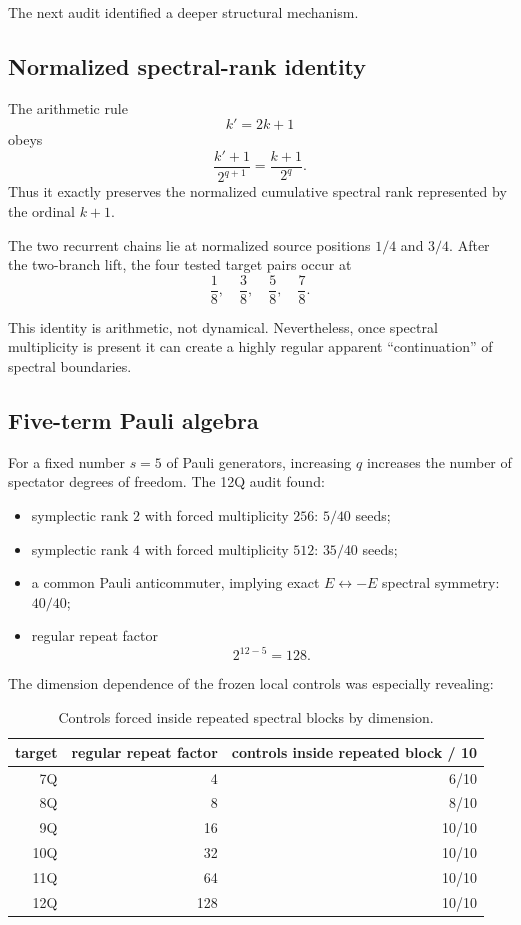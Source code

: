 \documentclass[11pt,a4paper]{article}
\begin{document}
The next audit identified a deeper structural mechanism.

\subsection{Normalized spectral-rank identity}

The arithmetic rule
\[
k' = 2k+1
\]
obeys
\[
\boxed{
\frac{k'+1}{2^{q+1}}
=
\frac{k+1}{2^q}.
}
\]
Thus it exactly preserves the normalized cumulative spectral rank represented
by the ordinal \(k+1\).

The two recurrent chains lie at normalized source positions \(1/4\) and
\(3/4\).  After the two-branch lift, the four tested target pairs occur at
\[
\frac18,\quad\frac38,\quad\frac58,\quad\frac78.
\]

This identity is arithmetic, not dynamical.  Nevertheless, once spectral
multiplicity is present it can create a highly regular apparent
``continuation'' of spectral boundaries.

\subsection{Five-term Pauli algebra}

For a fixed number \(s=5\) of Pauli generators, increasing \(q\) increases the
number of spectator degrees of freedom.  The 12Q audit found:

\begin{itemize}
\item symplectic rank \(2\) with forced multiplicity \(256\): \(5/40\) seeds;
\item symplectic rank \(4\) with forced multiplicity \(512\): \(35/40\) seeds;
\item a common Pauli anticommuter, implying exact \(E\leftrightarrow -E\)
      spectral symmetry: \(40/40\);
\item regular repeat factor
      \[
      2^{12-5}=128.
      \]
\end{itemize}

The dimension dependence of the frozen local controls was especially
revealing:

\begin{table}[H]
\centering
\caption{Controls forced inside repeated spectral blocks by dimension.}
\begin{tabular}{@{}rrr@{}}
\toprule
target & regular repeat factor & controls inside repeated block / 10\\
\midrule
7Q  & 4   & 6/10\\
8Q  & 8   & 8/10\\
9Q  & 16  & 10/10\\
10Q & 32  & 10/10\\
11Q & 64  & 10/10\\
12Q & 128 & 10/10\\
\bottomrule
\end{tabular}
\end{table}
\end{document}
